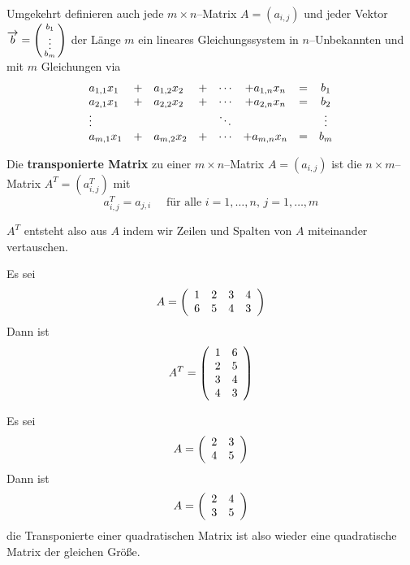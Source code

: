 \begin{beispiel}
Umgekehrt definieren auch jede $m \times n$--Matrix $A = \left(a_{i,j}\right)$ und jeder Vektor 
$\overrightarrow{b} 
= \left( \begin{smallmatrix} b_1 \\ \vdots \\b_m \end{smallmatrix} \right)$ der 
Länge $m$ ein 
lineares Gleichungssystem in $n$--Unbekannten und mit $m$ Gleichungen via
  $$ \begin{array} {l c l c c c l c l }
  a_{1,1} x_1 & + & a_{1,2} x_2 & + & \cdots & + a_{1,n} x_n & = & b_1 \\
  a_{2,1} x_1 & + & a_{2,2} x_2 & + & \cdots & + a_{2,n} x_n & = & b_2 \\
  \vdots & & & & \ddots & & & \vdots \\
  a_{m,1} x_1 & + & a_{m,2} x_2 & + & \cdots & + a_{m,n} x_n & = & b_m 
  \end{array} $$
  
\end{beispiel}

\begin{definition} Die \textbf{transponierte Matrix} zu einer 
$m \times n$--Matrix $A = \left(a_{i,j}\right)$ ist die $n \times m$--Matrix $A^T = (a^T_{i,j})$ mit
  $$ a^T_{i,j} = a_{j,i} \quad \textrm{ für alle } i = 1, \ldots, n, \, j = 1, \ldots, m $$
\end{definition}

\begin{notiz} $A^T$ entsteht also aus $A$ indem wir Zeilen und Spalten von $A$ miteinander vertauschen.
\end{notiz}

\begin{beispiel} Es sei 
   $$ A = \left( \begin{array} {l l l l} 1 & 2 & 3 & 4 \\ 6 & 5 & 4 & 3 \end{array} \right) $$
Dann ist 
   $$ A^T = \left( \begin{array} {l l} 1 & 6 \\ 2 & 5 \\ 3 & 4 \\ 4 & 3 \end{array} \right) $$
\end{beispiel}

\begin{beispiel} Es sei 
   $$ A = \left( \begin{array} {l l} 2 & 3 \\ 4 & 5 \end{array} \right) $$
Dann ist
   $$ A = \left( \begin{array} {l l} 2 & 4 \\ 3 & 5 \end{array} \right) $$
die Transponierte einer quadratischen Matrix ist also wieder eine quadratische Matrix der gleichen Größe.
\end{beispiel}

